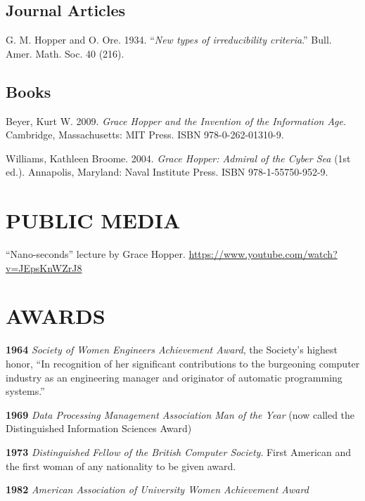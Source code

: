 \documentclass[10pt,]{article}
\begin{document}
\hypertarget{journal-articles}{%
\subsection{\texorpdfstring{\textbf{Journal
Articles}}{Journal Articles}}\label{journal-articles}}

G. M. Hopper and O. Ore. 1934. ``\emph{New types of irreducibility
criteria}.'' Bull. Amer. Math. Soc. 40 (216).

\hypertarget{books}{%
\subsection{\texorpdfstring{\textbf{Books}}{Books}}\label{books}}

Beyer, Kurt W. 2009. \emph{Grace Hopper and the Invention of the
Information Age}. Cambridge, Massachusetts: MIT Press. ISBN
978-0-262-01310-9.

Williams, Kathleen Broome. 2004. \emph{Grace Hopper: Admiral of the
Cyber Sea} (1st ed.). Annapolis, Maryland: Naval Institute Press. ISBN
978-1-55750-952-9.

\hypertarget{public-media}{%
\section{PUBLIC MEDIA}\label{public-media}}

``Nano-seconds'' lecture by Grace Hopper.
\url{https://www.youtube.com/watch?v=JEpsKnWZrJ8}

\hypertarget{awards}{%
\section{AWARDS}\label{awards}}

\textbf{1964} \emph{Society of Women Engineers Achievement Award}, the
Society's highest honor, ``In recognition of her significant
contributions to the burgeoning computer industry as an engineering
manager and originator of automatic programming systems.''

\textbf{1969} \emph{Data Processing Management Association Man of the
Year} (now called the Distinguished Information Sciences Award)

\textbf{1973} \emph{Distinguished Fellow of the British Computer
Society}. First American and the first woman of any nationality to be
given award.

\textbf{1982} \emph{American Association of University Women Achievement
Award}
\end{document}
